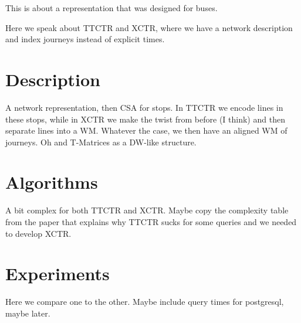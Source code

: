 	This is about a representation that was designed for buses.
	
	Here we speak about TTCTR and XCTR, where we have a network description and index journeys instead of explicit times.
	
	\section{Description}
	A network representation, then CSA for stops. In TTCTR we encode lines in these stops, while in XCTR we make the twist from before (I think) and then separate lines into a WM. Whatever the case, we then have an aligned WM of journeys. Oh and T-Matrices as a DW-like structure.
	
	\section{Algorithms}
	A bit complex for both TTCTR and XCTR. Maybe copy the complexity table from the paper that explains why TTCTR sucks for some queries and we needed to develop XCTR.
	
	\section{Experiments}
	Here we compare one to the other. Maybe include query times for postgresql, maybe later.